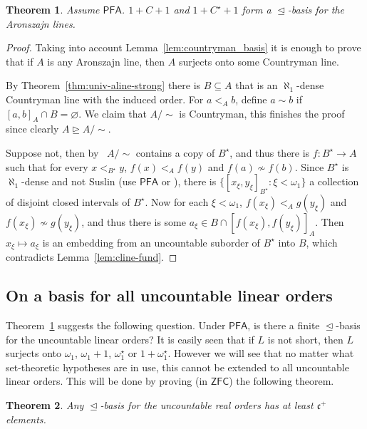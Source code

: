 \documentclass[10pt]{amsart}
\newtheorem{theorem}{Theorem}[section]
\theoremstyle{definition}
\theoremstyle{remark}
\newcommand{\es}{\varnothing}
\newcommand{\seb}{\subseteq}
\newcommand{\axiom}[1]{\mathsf{#1}}
\newcommand{\ZFC}{\axiom{ZFC}}
\newcommand{\PFA}{\axiom{PFA}}
\newcommand{\sleq}{\trianglelefteq}
\newcommand{\sgeq}{\trianglerighteq}
\newcommand{\1}{\mathbbm{1}}
\newcommand{\cc}{\mathfrak{c}}
\begin{document}
\begin{theorem}\label{thm:alines-basis}
  Assume $\PFA$. $1 + C + 1$ and $1 + C^{\star} + 1$ form a $\sleq$-basis for the
  Aronszajn lines.
\end{theorem}
\begin{proof}
  Taking into account Lemma~\ref{lem:countryman_basis}
  it is enough to prove that if $A$ is any Aronszajn line, then
  $A$ surjects onto some Countryman line.

  By Theorem~\ref{thm:univ-aline-strong} there is $B \seb A$ that is an
  $\aleph_{1}$-dense Countryman line with the induced order.
  For $a <_{A} b$, define $a \sim b$ if $[a,b]_{A} \cap B = \es$.
  We claim that $A / \sim$ is Countryman, this finishes the proof
  since clearly $A \sgeq A /\sim$.

  Suppose not, then by~\cite[Theorem~1.3]{Moore2009}
  $A / \sim$ contains a copy of $B^{\star}$, and thus
  there is $f : B^{\star} \to A$ such that for every $x <_{B^{\star}} y$,
  $f(x) <_{A} f(y)$ and $f(a) \nsim f(b)$. Since $B^{\star}$ is $\aleph_{1}$-dense
  and not Suslin (use $\PFA$ or \cite[Fact~3.9]{Martinez}),
  there is
  $\{{[x_{\xi},y_{\xi}]}_{B^{\star}} : \xi < \omega_{1}\}$ a collection
  of disjoint closed intervals of $B^{\star}$. Now
  for each $\xi < \omega_{1}$, $f(x_{\xi}) <_{A} g(y_{\xi})$ and
  $f(x_{\xi}) \nsim g(y_{\xi})$, and thus there is some
  $a_{\xi} \in B \cap {[f(x_{\xi}),f(y_{\xi})]}_{A}$.
  Then $x_{\xi} \mapsto a_{\xi}$ is an embedding from an uncountable
  suborder of $B^{\star}$ into $B$, which contradicts Lemma~\ref{lem:cline-fund}.
\end{proof}

\subsection{On a basis for all uncountable linear orders}\label{sec:basis-all}

Theorem~\ref{thm:alines-basis} suggests the following question. Under $\PFA$,
is there a finite $\sleq$-basis for the uncountable linear orders?
It is easily seen that if $L$ is not short,
then $L$ surjects onto $\omega_{1}$, $\omega_{1} + 1$, $\omega_{1}^{\star}$
or $1 + \omega_{1}^{\star}$. However we will see that no matter what
set-theoretic hypotheses are in use, this cannot be extended to all uncountable
linear orders. This will be done by proving (in
$\ZFC$) the following theorem.

\begin{theorem}\label{thm:real-basis}
  Any $\sleq$-basis for the uncountable real orders has at
  least $\cc^{+}$ elements.
\end{theorem}
\end{document}
